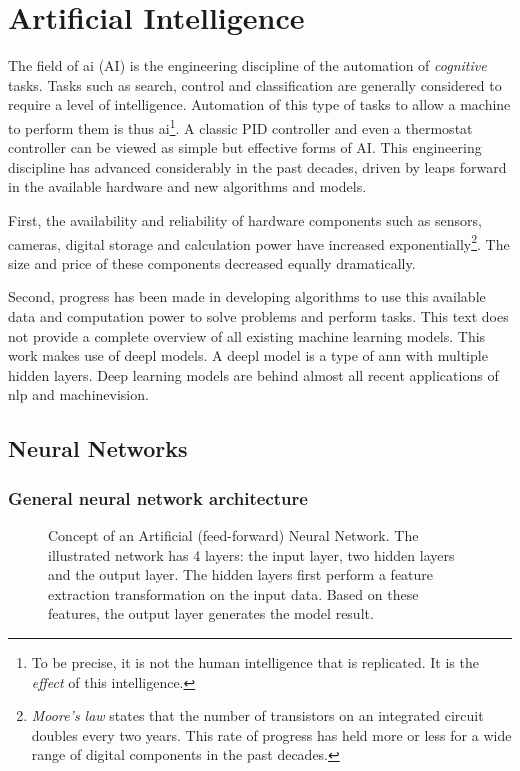 \section{Artificial Intelligence}
\par{
    The field of \Gls{ai} (AI) is the engineering discipline of the automation of \textit{cognitive} tasks.
    Tasks such as search, control and classification are generally considered to require a level of intelligence. 
    Automation of this type of tasks to allow a machine to perform them is thus \Gls{ai}\footnote{To be precise, it is not the human intelligence that is replicated. It is the \textit{effect} of this intelligence.}.
    A classic PID controller and even a thermostat controller can be viewed as simple but effective forms of AI.
    This engineering discipline has advanced considerably in the past decades, driven by leaps forward in the available hardware and new algorithms and models. 
}
\par{
    First, the availability and reliability of hardware components such as sensors, cameras, digital storage and calculation power have increased exponentially\footnote{ \textit{Moore's law} states that the number of transistors on an integrated circuit doubles every two years. This rate of progress has held more or less for a wide range of digital components in the past decades.}.
    The size and price of these components decreased equally dramatically. }
\par{
    Second, progress has been made in developing algorithms to use this available data and computation power to solve problems and perform tasks.
    This text does not provide a complete overview of all existing machine learning models. 
    This work makes use of \Gls{deepl} models.
    A \Gls{deepl} model is a type of \acrfull{ann} with multiple hidden layers. 
    Deep learning models are behind almost all recent applications of \acrfull{nlp} and \Gls{machinevision}.
}

\subsection{Neural Networks}
\subsubsection{General neural network architecture}

\begin{figure}
    \centering
    
    \caption{
        Concept of an Artificial (feed-forward) Neural Network. 
        The illustrated network has 4 layers: the input layer, two hidden layers and the output layer.
        The hidden layers first perform a feature extraction transformation on the input data.
        Based on these features, the output layer generates the model result.
        \label{fig:ann}
        }
\end{figure}

